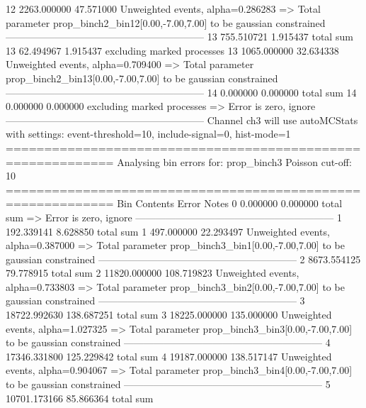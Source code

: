 12         2263.000000     47.571000       Unweighted events, alpha=0.286283
  => Total parameter prop_binch2_bin12[0.00,-7.00,7.00] to be gaussian constrained
------------------------------------------------------------
13         755.510721      1.915437        total sum                     
13         62.494967       1.915437        excluding marked processes    
13         1065.000000     32.634338       Unweighted events, alpha=0.709400
  => Total parameter prop_binch2_bin13[0.00,-7.00,7.00] to be gaussian constrained
------------------------------------------------------------
14         0.000000        0.000000        total sum                     
14         0.000000        0.000000        excluding marked processes    
  => Error is zero, ignore      
------------------------------------------------------------
Channel ch3 will use autoMCStats with settings: event-threshold=10, include-signal=0, hist-mode=1
============================================================
Analysing bin errors for: prop_binch3
Poisson cut-off: 10
============================================================
Bin        Contents        Error           Notes                         
0          0.000000        0.000000        total sum                     
  => Error is zero, ignore      
------------------------------------------------------------
1          192.339141      8.628850        total sum                     
1          497.000000      22.293497       Unweighted events, alpha=0.387000
  => Total parameter prop_binch3_bin1[0.00,-7.00,7.00] to be gaussian constrained
------------------------------------------------------------
2          8673.554125     79.778915       total sum                     
2          11820.000000    108.719823      Unweighted events, alpha=0.733803
  => Total parameter prop_binch3_bin2[0.00,-7.00,7.00] to be gaussian constrained
------------------------------------------------------------
3          18722.992630    138.687251      total sum                     
3          18225.000000    135.000000      Unweighted events, alpha=1.027325
  => Total parameter prop_binch3_bin3[0.00,-7.00,7.00] to be gaussian constrained
------------------------------------------------------------
4          17346.331800    125.229842      total sum                     
4          19187.000000    138.517147      Unweighted events, alpha=0.904067
  => Total parameter prop_binch3_bin4[0.00,-7.00,7.00] to be gaussian constrained
------------------------------------------------------------
5          10701.173166    85.866364       total sum                     
